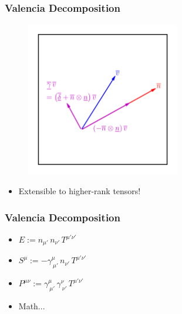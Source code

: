 \documentclass{beamer}
\begin{document}
\begin{frame}
\frametitle{Valencia Decomposition}

  \begin{figure}[htb!]
    \centering
    \includegraphics[width=0.6\textwidth]{decomp.png}
  \end{figure}

  \begin{itemize}[<+->]
    \item[]
     Extensible to higher-rank tensors!
  \end{itemize}

\end{frame}

\begin{frame}
\frametitle{Valencia Decomposition}

  \begin{itemize}[<+->]
    \item[]
      $E:=n_{\mu'}\,n_{\nu'}\,T^{\mu'\nu'}$\vspace{1em}
    \item[]
      $S^{\mu}:=-\gamma^{\mu}_{~\mu'}\,n_{\nu'}\,T^{\mu'\nu'}$\vspace{1em}
    \item[]
      $P^{\mu\nu}:=\gamma^{\mu}_{~\mu'}\,\gamma^{\nu}_{~\nu'}\,
      T^{\mu'\nu'}$\vspace{1em}
    \item[]
      Math...
  \end{itemize}

\end{frame}
\end{document}
